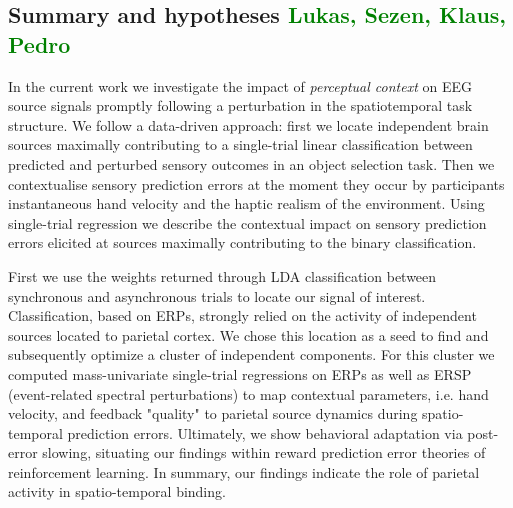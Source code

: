 \subsection{Summary and hypotheses \textcolor{green}{Lukas, Sezen, Klaus, Pedro}}
In the current work we investigate the impact of \textit{perceptual context} on EEG source signals promptly following a perturbation in the spatiotemporal task structure. We follow a data-driven approach: first we locate independent brain sources maximally contributing to a single-trial linear classification between predicted and perturbed sensory outcomes in an object selection task. Then we contextualise sensory prediction errors at the moment they occur by participants instantaneous hand velocity and the haptic realism of the environment. Using single-trial regression we describe the contextual impact on sensory prediction errors elicited at sources maximally contributing to the binary classification.

First we use the weights returned through LDA classification between synchronous and asynchronous trials to locate our signal of interest. Classification, based on ERPs, strongly relied on the activity of independent sources located to parietal cortex. We chose this location as a seed to find and subsequently optimize a cluster of independent components. For this cluster we computed mass-univariate single-trial regressions on ERPs as well as ERSP (event-related spectral perturbations) to map contextual parameters, i.e. hand velocity, and feedback "quality" to parietal source dynamics during spatio-temporal prediction errors. Ultimately, we show behavioral adaptation via post-error slowing, situating our findings within reward prediction error theories of reinforcement learning. In summary, our findings indicate the role of parietal activity in spatio-temporal binding.


